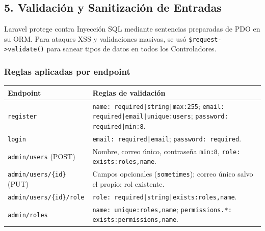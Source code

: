 \subsection{5. Validación y Sanitización de Entradas}
Laravel protege contra Inyección SQL mediante sentencias preparadas de PDO en su ORM. Para ataques XSS y validaciones masivas, se usó \texttt{\$request->validate()} para sanear tipos de datos en todos los Controladores.

\subsubsection{Reglas aplicadas por endpoint}
\begin{longtable}{p{4.2cm}p{10.8cm}}
\toprule
\textbf{Endpoint} & \textbf{Reglas de validación} \\
\midrule
\endhead
\texttt{register} & \texttt{name: required|string|max:255}; \texttt{email: required|email|unique:users}; \texttt{password: required|min:8}. \\
\texttt{login} & \texttt{email: required|email}; \texttt{password: required}. \\
\texttt{admin/users} (POST) & Nombre, correo único, contraseña \texttt{min:8}, \texttt{role: exists:roles,name}. \\
\texttt{admin/users/\{id\}} (PUT) & Campos opcionales (\texttt{sometimes}); correo único salvo el propio; rol existente. \\
\texttt{admin/users/\{id\}/role} & \texttt{role: required|string|exists:roles,name}. \\
\texttt{admin/roles} & \texttt{name: unique:roles,name}; \texttt{permissions.*: exists:permissions,name}. \\
\bottomrule
\end{longtable}

